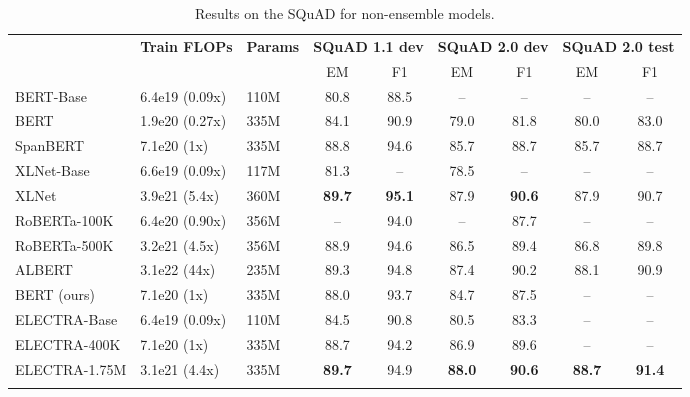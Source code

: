 \documentclass{article}
\newcommand\tstrut{\rule{0pt}{2.6ex}}
\newcommand\bstrut{\rule[-1.0ex]{0pt}{0pt}}
\newcommand{\thinline}{\Xhline{1.5\arrayrulewidth}}
\newcommand{\thickline}{\Xhline{2.5\arrayrulewidth}}
\newcommand{\tsep}	{\bstrut \\ \thinline}
\newcommand{\ttop}{\thickline}
\newcommand{\tbottom}{\bstrut \\ \thickline}
\begin{document}
\addtolength{\tabcolsep}{-4.5pt}
\begin{table*}[t!]
\small
\begin{center}
\begin{tabularx}{1.0\linewidth}{X@{\hskip 4mm} l@{\hskip 4mm} l@{\hskip 4mm} c c c c c c}
\ttop
\multirow{2}{*}{\textbf{Model}} & \multirow{2}{*}{\textbf{Train FLOPs}} & \multirow{2}{*}{\textbf{Params}} & \multicolumn{2}{c}{\textbf{SQuAD 1.1 dev\phantom{....}}} & \multicolumn{2}{c}{\textbf{SQuAD 2.0 dev\phantom{....}}} & \multicolumn{2}{c}{\textbf{SQuAD 2.0 test}} \tstrut \\
 & & & EM & F1 & EM & F1 & EM & F1 \tsep
 BERT-Base & 6.4e19 (0.09x) & 110M &  80.8 & 88.5 & -- & -- & -- & -- \tstrut \\
 BERT & 1.9e20 (0.27x) & 335M &  84.1 & 90.9 & 79.0 & 81.8 & 80.0 & 83.0\\
 SpanBERT & 7.1e20 (1x) & 335M & 88.8 & 94.6 & 85.7 & 88.7 & 85.7 & 88.7 \\
 XLNet-Base & 6.6e19 (0.09x) & 117M & 81.3 & -- & 78.5 & -- & -- & -- \\
 XLNet & 3.9e21 (5.4x) & 360M & \textbf{89.7} & \textbf{95.1} & 87.9 & \textbf{90.6} & 87.9 & 90.7 \\
 RoBERTa-100K & 6.4e20 (0.90x) & 356M & -- & 94.0 & -- & 87.7 & -- & -- \\
 RoBERTa-500K & 3.2e21 (4.5x) & 356M & 88.9 & 94.6 & 86.5 & 89.4 & 86.8 & 89.8 \\
 ALBERT & 3.1e22 (44x) & 235M & 89.3 & 94.8 & 87.4 & 90.2& 88.1 & 90.9 \tsep
 BERT (ours) &  7.1e20 (1x) & 335M & 88.0 & 93.7 & 84.7 & 87.5& -- & -- \tstrut \\
 ELECTRA-Base & 6.4e19 (0.09x) & 110M & 84.5 & 90.8 & 80.5 & 83.3 & -- & --\\
 ELECTRA-400K & 7.1e20 (1x) & 335M & 88.7 & 94.2 & 86.9 & 89.6 & -- & --\\
 ELECTRA-1.75M & 3.1e21 (4.4x) & 335M & \textbf{89.7} & 94.9 & \textbf{88.0} & \textbf{90.6} & \textbf{88.7} & \textbf{91.4}
 \tbottom
\end{tabularx} 
\end{center}
\caption{Results on the SQuAD for non-ensemble models.}
\label{tab:squad}
\end{table*}
\addtolength{\tabcolsep}{4.5pt}

                            
\end{document}
